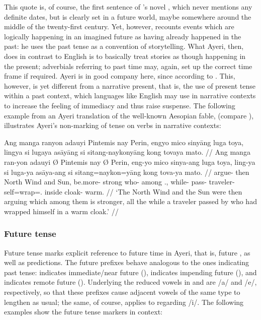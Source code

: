 This quote is, of course, the first sentence of 
\citeauthor{gibson:neuromancer}'s novel , which 
never mentions any definite dates, but is clearly set in a future world, maybe 
somewhere around the middle of the twenty-first century. Yet, however, 
\citeauthor{gibson:neuromancer} recounts events which are logically happening in 
an imagined future as having already happened in the past: he uses the past 
tense as a convention of storytelling. What Ayeri, then, does in contrast to 
English is to basically treat stories as though happening in the present; 
adverbials referring to past time may, again, set up the correct time frame if 
required. Ayeri is in good company here, since according to 
\citeauthor{dahl1985} . This, however, is yet 
different from a narrative present, that is, the use of present tense 
within a past context, which languages like English may use in narrative 
contexts to increase the feeling of immediacy and thus raise suspense. The 
following example from an Ayeri translation of the well-known Aesopian fable, 
 (compare \cite{aesop:northwind}), illustrates 
Ayeri's non-marking of tense on verbs in narrative contexts:

\ex
\begingl
	\gla Ang manga ranyon adauyi {} Pintemis nay {} Perin, engyo mico 
		sinyāng luga toya, lingya si lugaya asāyāng si sitang-naykonyāng 
		kong tovaya mato. //
	\glb Ang manga ran-yon adauyi Ø  Pintemis nay Ø Perin, eng-yo mico 
		sinya-ang luga toya, ling-ya si luga-ya asāya-ang si 
		sitang=naykon=yāng kong tova-ya mato. //
	\glc \AgtT{} \Prog{} argue-\TplN{} then \Top{} {North Wind} and 
		\Top{} Sun, be.more-\TsgN{} strong who-\Aarg{} among 
		\TplN{}.\Loc{}, while-\Loc{} \Rel{} pass-\TsgM{} 
		traveler-\Aarg{} \Rel{} self=wrap=\TsgM{}.\Aarg{} inside 
		cloak-\Loc{} warm. //
	\glft `The North Wind and the Sun were then arguing which among them is 
		stronger, all the while a traveler passed by who had wrapped 
		himself in a warm cloak.' //
\endgl
\xe


\subsubsection{Future tense}
Future tense marks explicit reference to future time in Ayeri, that is, future 
, as well 
as predictions. The future prefixes behave analogous to the ones indicating 
past tense:  indicates immediate/near future (\NFut{}), 
 indicates impending future (\Fut{}), and  
indicates remote future (\RFut{}). Underlying the reduced vowels in 
 and  are /a/ and /e/, respectively, so that these 
prefixes cause adjacent vowels of the same type to lengthen as usual; the same, 
of course, applies to  regarding /i/. The following examples 
show the future tense markers in context:

